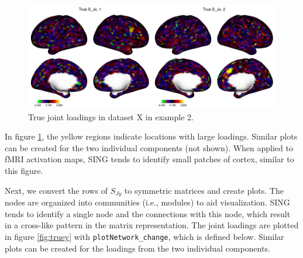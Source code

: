 \begin{figure}
\includegraphics[width=1\linewidth]{figures/True_SJx12_brain} \caption{True joint loadings in dataset X in example 2.}\label{fig:truex}
\end{figure}

In figure \ref{fig:truex}, the yellow regions indicate locations with large loadings. Similar plots can be created for the two individual components (not shown). When applied to fMRI activation maps, SING tends to identify small patches of cortex, similar to this figure.

Next, we convert the rows of \(S_{Jy}\) to symmetric matrices and create plots. The nodes are organized into communities (i.e., modules) to aid visualization. SING tends to identify a single node and the connections with this node, which result in a cross-like pattern in the matrix representation. The joint loadings are plotted in figure \ref{fig:truey} with \texttt{plotNetwork\_change}, which is defined below. Similar plots can be created for the loadings from the two individual components.

